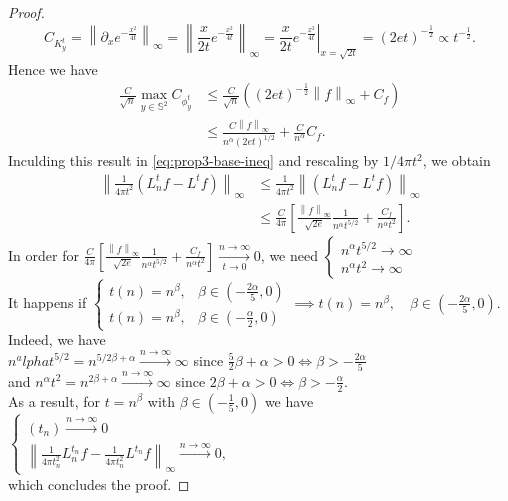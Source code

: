 \documentclass{article} %
\newcommand{\norm}[1]{\left\lVert#1\right\rVert}
\renewcommand{\S}{\mathbb{S}}
\newcommand{\linefrac}[2]{
    {#1/#2}
}
\begin{document}
\begin{proof}
\begin{equation*}
C_{K^t_y} = \norm{\partial_x e^{-\frac{x^2}{4t}}}_\infty = \norm{\frac{x}{2t}e^{-\frac{x^2}{4t}}}_\infty = \left. \frac{x}{2t}e^{-\frac{x^2}{4t}}\right|_{x=\sqrt{2t}}=(2et)^{-\frac{1}{2}}\propto t ^ {-\frac{1}{2}}.
\end{equation*}
Hence we have
\begin{align*}
	\frac{C}{\sqrt{n}}  \max _{y\in \S^2} C_{\phi^t_y} 
	&\leq  \frac{C}{\sqrt{n}} \left( (2et)^{-\frac{1}{2}} \norm{f}_\infty + C_f \right)\\
	&\leq \frac{C \norm{f}_\infty}{n^\alpha(2et)^{1/2}} +   \frac{C}{n^\alpha} C_f.
\end{align*}
Inculding this result in \eqref{eq:prop3-base-ineq} and rescaling by $\linefrac{1}{4\pi t^2}$, we obtain
\begin{align*}
	\norm{\frac{1}{4\pi t^2}\left(L_n^tf-L^tf\right)}_\infty&\leq \frac{1}{4\pi t^2}\norm{\left(L_n^tf-L^tf\right)}_\infty \\
	&\leq \frac{C}{4\pi}\left[\frac{\norm{f}_\infty}{\sqrt{2e}}\frac{1}{n^\alpha t^{5/2}} + \frac{C_f}{n^\alpha t^2}\right].
\end{align*}
In order for $ \frac{C}{4\pi}\left[\frac{\norm{f}_\infty}{\sqrt{2e}}\frac{1}{n^\alpha t^{5/2}} + \frac{C_f}{n^\alpha t^2}\right] \xrightarrow[t\to 0 ]{n\to\infty}0$, 
we need $\begin{cases}
n^\alpha t^{5/2} \rightarrow \infty\\
n^\alpha t^2 \rightarrow \infty
\end{cases}$ \\
It happens if $\begin{cases}
t(n) = n^\beta, &\beta\in(-\frac{2\alpha}{5}, 0) \\
t(n) = n^\beta, &\beta\in(-\frac{\alpha}{2}, 0)
\end{cases} \implies t(n) = n^\beta, \quad \beta\in(-\frac{2\alpha}{5}, 0)$.\\
Indeed, we have\\
$n^alpha t^{5/2}=n^{5/2\beta+\alpha}\xrightarrow{n \to \infty} \infty$ since $\frac{5}{2}\beta+\alpha>0 \iff \beta>-\frac{2\alpha}{5}$\\
and $n^\alpha t^2=n^{2\beta+\alpha}\xrightarrow {n \to \infty} \infty$ since $2\beta+\alpha>0 \iff \beta>-\frac{\alpha}{2}$.\\
As a result, for $t=n^\beta$ with $\beta\in(-\frac{1}{5}, 0)$ we have
$\begin{cases}
(t_n)\xrightarrow{n\to\infty}0\\
\norm{\frac{1}{4\pi t_n^2}L_n^{t_n}f-\frac{1}{4\pi t_n^2}L^{t_n}f}_\infty  \xrightarrow{n\to\infty}0,
\end{cases}$\\
which concludes the proof.
\end{proof}
\end{document}

